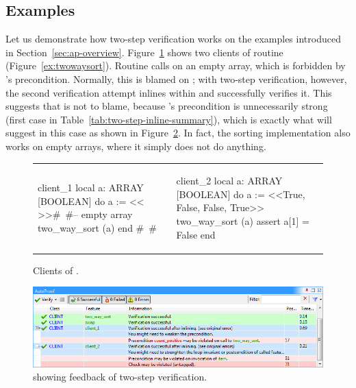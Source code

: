 \subsection{Examples} \label{sec:examples-two-step}

Let us demonstrate how two-step verification works on the examples introduced in Section~\ref{sec:ap-overview}.
Figure~\ref{ex:twowaysort-client} shows two clients of routine  (Figure~\ref{ex:twowaysort}).
Routine  calls  on an empty array, which is forbidden by 's precondition.
Normally, this is blamed on ; with two-step verification, however, the second verification attempt inlines  within \mbox{} and successfully verifies it.
This suggests that  is not to blame, because 's precondition is unnecessarily strong (first case in Table~\ref{tab:two-step-inline-summary}), which is exactly what \AutoProof will suggest in this case as shown in Figure~\ref{fig:two-step-feedback}.
In fact, the sorting implementation also works on empty arrays, where it simply does not do anything.

\begin{figure}[th]
\begin{tabular}{ll}
{\begin{erunning}
client_1
	local a: ARRAY [BOOLEAN]
	do
		a := << >>#\ #-- empty array
		two_way_sort (a)
	end
 #\ #
\end{erunning}}
&
\hspace{3mm}
{\begin{erunning}
client_2
	local a: ARRAY [BOOLEAN]
	do
		a := <<True, False, False, True>>
		two_way_sort (a)
		assert a[1] = False
	end
\end{erunning}}
\end{tabular}
\caption{Clients of .}
\label{ex:twowaysort-client}
\end{figure}

\begin{figure}[!htb]
\centering
\includegraphics[width=\columnwidth]{images/eve_panel_twostep.png}
\caption{\AutoProof showing feedback of two-step verification.}
\label{fig:two-step-feedback}
\end{figure}


